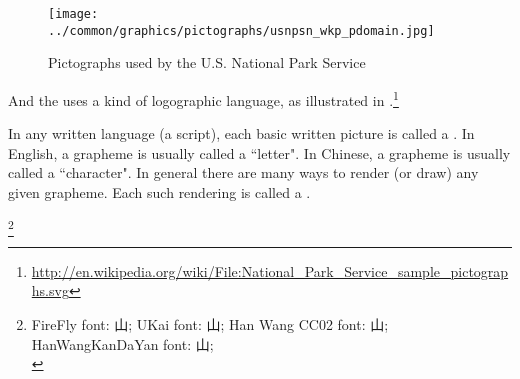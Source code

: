 \begin{figure}
  \centering
  \texttt{[image: ../common/graphics/pictographs/usnpsn\_wkp\_pdomain.jpg]}
  \caption{Pictographs used by the U.S. National Park Service \label{fig:usnpsn}}
\end{figure}
\begin{example}
\label{ex:usnps}
And the  uses a kind of logographic language, as illustrated in 
.\footnote{\url{http://en.wikipedia.org/wiki/File:National_Park_Service_sample_pictographs.svg}}
\end{example}

In any written language (a script), each basic written picture is called a .
In English, a grapheme is usually called a ``letter".
In Chinese, a grapheme is usually called a ``character".
In general there are many ways to render (or draw) any given grapheme.
Each such rendering is called a .

\begin{example}
\label{ex:grapheme_a}
\end{example}

\begin{example}
\footnote{
  FireFly font: {\fntFirefly 山}; 
  UKai font:    {\fntUKai 山};
  Han Wang CC02 font: {\fntHanWangCC 山};
  HanWangKanDaYan font: {\fntHanWangKanDaYan 山};\\
  }
\label{ex:grapheme_shan}
\end{example}



